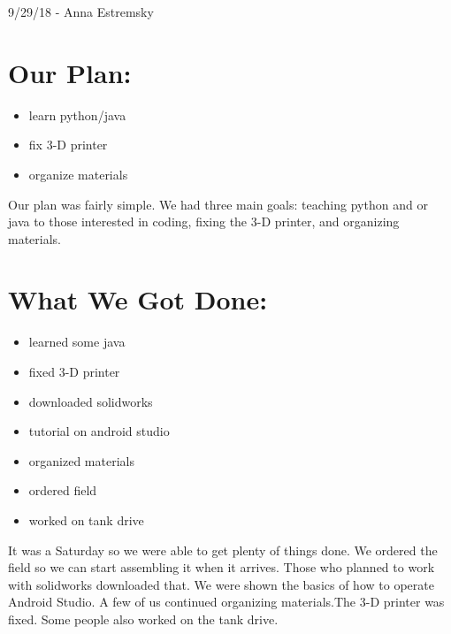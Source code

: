 \documentclass[12pt]{article}
\begin{document}
9/29/18 - Anna Estremsky

\section{Our Plan:} %
\begin{itemize}
	\item learn python/java
\item fix 3-D printer
\item organize materials
\end{itemize}

Our plan was fairly simple. We had three main goals: teaching python and or java to those interested in coding, fixing the 3-D printer, and organizing materials.  

\section{What We Got Done:} %
\begin{itemize}
	\item learned some java
\item fixed 3-D printer
\item downloaded solidworks
\item tutorial on android studio
\item organized materials
\item ordered field
\item worked on tank drive

\end{itemize}

It was a Saturday so we were able to get plenty of things done. We ordered the field so we can start assembling it when it arrives. Those who planned to work with solidworks downloaded that. We were shown the basics of how to operate Android Studio. A few of us continued organizing materials.The 3-D printer was fixed. Some people also worked on the tank drive.
\end{document}
